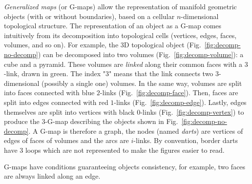 \emph{Generalized maps} (or G-maps) \cite{lienhardt1991topological,
  Damiand-Lienhardt14} allow the representation of manifold geometric objects
(with or without boundaries), based on a cellular $n$-dimensional topological
structure. %
The representation of an object as a G-map comes intuitively from its
decomposition into topological cells (vertices, edges, faces, volu\-mes, and so
on). %
For example, the 3D topological object (Fig.~\ref{fig:decomp-no-decomp}) can be
decomposed into two volumes (Fig.~\ref{fig:decomp-volume}): a cube and a pyramid. %
These volumes are \emph{linked} along their common faces with a $3$-link, drawn
in green. %
The index "$3$" means that the link connects two $3$-dimensional (possibly a
single one) volumes. %
In the same way, volumes are split into faces connected with blue $2$-links
(Fig.~\ref{fig:decomp-face}). %
Then, faces are split into edges connected with red $1$-links
(Fig.~\ref{fig:decomp-edge}). %
Lastly, edges themselves are split into vertices with black $0$-links
(Fig.~\ref{fig:decomp-vertex}) to produce the $3$-G-map describing the objects
shown in Fig.~\ref{fig:decomp-no-decomp}. %
A G-map is therefore a graph, the nodes (named \emph{darts}) are vertices of edges 
of faces of volumes and the arcs are $i$-links. %
By convention, border darts have $3$ loops which are not represented to %
make the figures easier to read.

G-maps have conditions guaranteeing objects consistency, for example, two faces
are always linked along an edge.

